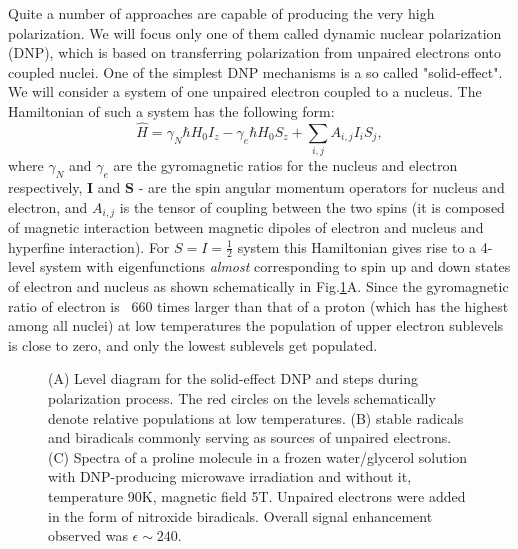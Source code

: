 \documentclass[a4paper, 12pt]{article}
\begin{document}
  Quite a number of approaches are capable of producing the very high polarization. We will focus only one of them called dynamic nuclear polarization (DNP), which is based on transferring polarization from unpaired electrons onto coupled nuclei. One of the simplest DNP mechanisms is a so called "solid-effect". We will consider a system of one unpaired electron coupled to a nucleus. The Hamiltonian of such a system has the following form:
  \begin{equation}
  \hat H = \gamma_N \hbar H_0 I_z - \gamma_e \hbar H_0 S_z + \sum_{i,j}A_{i,j}I_i S_j,
  \end{equation}
where $\gamma_N$ and $\gamma_e$ are the gyromagnetic ratios for the nucleus and electron respectively, $\bm{I}$ and $\bm{S}$ - are the spin angular momentum operators for nucleus and electron, and $A_{i,j}$ is the tensor of coupling between the two spins (it is composed of magnetic interaction between magnetic dipoles of electron and nucleus and hyperfine interaction). For $S=I=\frac{1}{2}$ system this Hamiltonian gives rise to a 4-level system with eigenfunctions \textit{almost} corresponding to spin up and down states of electron and nucleus as shown schematically in Fig.\ref{fig:solid_effect}A. Since the gyromagnetic ratio of electron is ~660 times larger than that of a proton (which has the highest among all nuclei) at low temperatures the population of upper electron sublevels is close to zero, and only the lowest sublevels get populated.

\begin{figure}[ht]
\caption{(A) Level diagram for the solid-effect DNP and steps during polarization process. The red circles on the levels schematically denote relative populations at low temperatures. (B) stable radicals and biradicals commonly serving as sources of unpaired electrons. (C) Spectra of a proline molecule in a frozen water/glycerol solution with DNP-producing microwave irradiation and without it, temperature 90K, magnetic field 5T. Unpaired electrons were added in the form of nitroxide biradicals. Overall signal enhancement observed was $\epsilon \sim 240$.}
\label{fig:solid_effect}
\centering
\end{figure}
  
\end{document}
